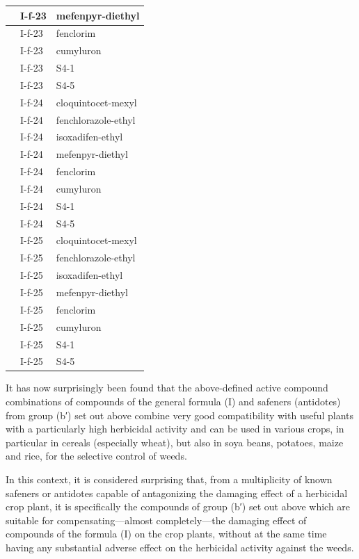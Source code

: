 \documentclass[11pt,a4paper]{article}
\begin{document}
\begin{table}[h]
\begin{tabular}{|l|l|l|}
 & I-f-23 & mefenpyr-diethyl \\ \hline
 & I-f-23 & fenclorim \\ \hline
 & I-f-23 & cumyluron \\ \hline
 & I-f-23 & S4-1 \\ \hline
 & I-f-23 & S4-5 \\ \hline
 & I-f-24 & cloquintocet-mexyl \\ \hline
 & I-f-24 & fenchlorazole-ethyl \\ \hline
 & I-f-24 & isoxadifen-ethyl \\ \hline
 & I-f-24 & mefenpyr-diethyl \\ \hline
 & I-f-24 & fenclorim \\ \hline
 & I-f-24 & cumyluron \\ \hline
 & I-f-24 & S4-1 \\ \hline
 & I-f-24 & S4-5 \\ \hline
 & I-f-25 & cloquintocet-mexyl \\ \hline
 & I-f-25 & fenchlorazole-ethyl \\ \hline
 & I-f-25 & isoxadifen-ethyl \\ \hline
 & I-f-25 & mefenpyr-diethyl \\ \hline
 & I-f-25 & fenclorim \\ \hline
 & I-f-25 & cumyluron \\ \hline
 & I-f-25 & S4-1 \\ \hline
 & I-f-25 & S4-5 \\ \hline
\end{tabular}
\end{table}

It has now surprisingly been found that the above-defined active compound combinations of compounds of the general formula (I) and safeners (antidotes) from group (b′) set out above combine very good compatibility with useful plants with a particularly high herbicidal activity and can be used in various crops, in particular in cereals (especially wheat), but also in soya beans, potatoes, maize and rice, for the selective control of weeds.

In this context, it is considered surprising that, from a multiplicity of known safeners or antidotes capable of antagonizing the damaging effect of a herbicidal crop plant, it is specifically the compounds of group (b′) set out above which are suitable for compensating—almost completely—the damaging effect of compounds of the formula (I) on the crop plants, without at the same time having any substantial adverse effect on the herbicidal activity against the weeds.
\end{document}

